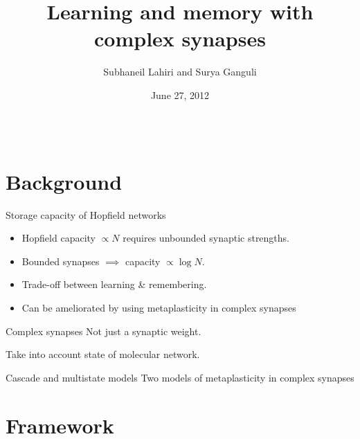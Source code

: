 \documentclass[final,hyperref={pdfpagelabels=false}]{beamer}
\title{Learning and memory with complex synapses}
\author{Subhaneil Lahiri and Surya Ganguli}
\institute[Stanford]{%
Department of Applied Physics, Stanford University, Stanford CA
}
\date[6/27/12]{June 27, 2012}%
\newcommand{\net}{molecular network}
\begin{document}
\begin{frame}{}

\begin{columns}[t]


\begin{column}{0.32\linewidth}

\section{Background}


\begin{block}{Storage capacity of Hopfield networks}
%
 \begin{itemize}
   \item Hopfield capacity $\propto N$ requires unbounded synaptic strengths.
   \item Bounded synapses $\implies$ capacity $\propto\log N$.
   \item Trade-off between learning \& remembering.
   \item Can be ameliorated by using metaplasticity in complex synapses
 \end{itemize}
%
\end{block}


\begin{block}{Complex synapses}
%
 Not just a synaptic weight.
 
 \vp Take into account state of \net.
%
\end{block}


\begin{block}{Cascade and multistate models}
%
 Two models of metaplasticity in complex synapses
%
\end{block}



\section{Framework}


\end{column}
\end{columns}
\end{frame}
\end{document}
